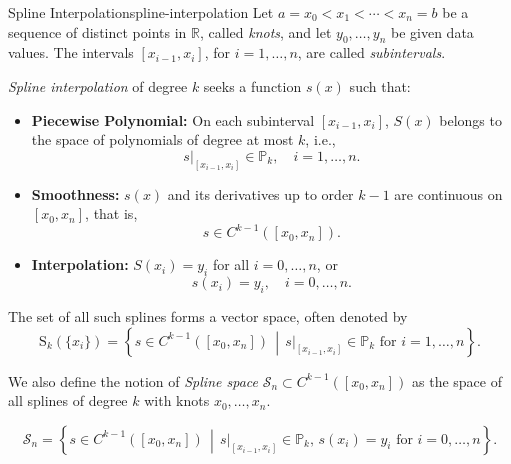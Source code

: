 \begin{definition}{Spline Interpolation}{spline-interpolation}
    Let \(a = x_0 < x_1 < \cdots < x_n = b\) be a sequence of distinct points in \(\mathbb{R}\), called \emph{knots}, and let \(y_0, \ldots, y_n\) be given data values. The intervals \([x_{i-1}, x_i]\), for \(i = 1, \ldots, n\), are called \emph{subintervals}.

    \emph{Spline interpolation} of degree \(k\) seeks a function \(s(x)\) such that:
    \begin{itemize}
        \item \textbf{Piecewise Polynomial:} On each subinterval \([x_{i-1}, x_i]\), \(S(x)\) belongs to the space of polynomials of degree at most \(k\), i.e.,
              \begin{equation}
                  s|_{[x_{i-1}, x_i]} \in \mathbb{P}_k, \quad i = 1, \ldots, n.
              \end{equation}
        \item \textbf{Smoothness:} \(s(x)\) and its derivatives up to order \(k-1\) are continuous on \([x_0, x_n]\), that is,
              \begin{equation}
                  s \in C^{k-1}([x_0, x_n]).
              \end{equation}
        \item \textbf{Interpolation:} \(S(x_i) = y_i\) for all \(i = 0, \ldots, n\), or
              \begin{equation}
                  s(x_i) = y_i, \quad i = 0, \ldots, n.
              \end{equation}
    \end{itemize}
    The set of all such splines forms a vector space, often denoted by
    \begin{equation}
        \mathrm{S}_k(\{x_i\}) = \left\{ s \in C^{k-1}([x_0, x_n]) \,\middle|\, s|_{[x_{i-1}, x_i]} \in \mathbb{P}_k \text{ for } i=1,\ldots,n \right\}.
    \end{equation}
\end{definition}

We also define the notion of \emph{Spline space} \(\mathcal{S}_n \subset C^{k-1}([x_0, x_n])\) as the space of all splines of degree \(k\) with knots \(x_0, \ldots, x_n\).

\[
    \mathcal{S}_n = \left\{ s \in C^{k-1}([x_0, x_n]) \,\middle|\, s|_{[x_{i-1}, x_i]} \in \mathbb{P}_k, \, s(x_i) = y_i \text{ for } i=0,\ldots,n \right\}.
\]

